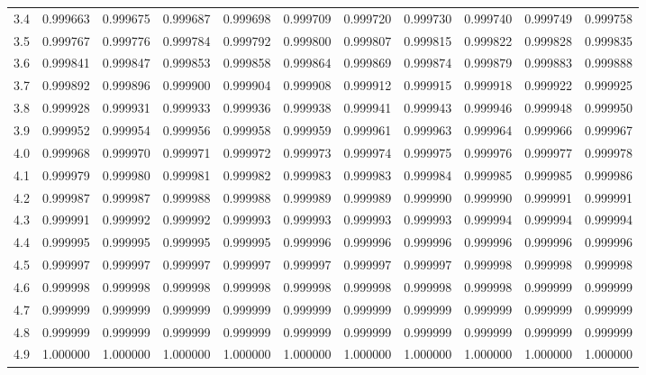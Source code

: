 \documentclass[12pt, a4paper]{article}
\begin{document}
\begin{center}
\begin{tabular}{lllllllllll}
3.4& 0.999663&0.999675&0.999687&0.999698&0.999709&0.999720&0.999730&0.999740&0.999749&0.999758 \\
3.5& 0.999767&0.999776&0.999784&0.999792&0.999800&0.999807&0.999815&0.999822&0.999828&0.999835 \\
3.6& 0.999841&0.999847&0.999853&0.999858&0.999864&0.999869&0.999874&0.999879&0.999883&0.999888 \\
3.7& 0.999892&0.999896&0.999900&0.999904&0.999908&0.999912&0.999915&0.999918&0.999922&0.999925 \\
3.8& 0.999928&0.999931&0.999933&0.999936&0.999938&0.999941&0.999943&0.999946&0.999948&0.999950 \\
3.9& 0.999952&0.999954&0.999956&0.999958&0.999959&0.999961&0.999963&0.999964&0.999966&0.999967 \\
4.0& 0.999968&0.999970&0.999971&0.999972&0.999973&0.999974&0.999975&0.999976&0.999977&0.999978 \\
4.1& 0.999979&0.999980&0.999981&0.999982&0.999983&0.999983&0.999984&0.999985&0.999985&0.999986 \\
4.2& 0.999987&0.999987&0.999988&0.999988&0.999989&0.999989&0.999990&0.999990&0.999991&0.999991 \\
4.3& 0.999991&0.999992&0.999992&0.999993&0.999993&0.999993&0.999993&0.999994&0.999994&0.999994 \\
4.4& 0.999995&0.999995&0.999995&0.999995&0.999996&0.999996&0.999996&0.999996&0.999996&0.999996 \\
4.5& 0.999997&0.999997&0.999997&0.999997&0.999997&0.999997&0.999997&0.999998&0.999998&0.999998 \\
4.6& 0.999998&0.999998&0.999998&0.999998&0.999998&0.999998&0.999998&0.999998&0.999999&0.999999 \\
4.7& 0.999999&0.999999&0.999999&0.999999&0.999999&0.999999&0.999999&0.999999&0.999999&0.999999 \\
4.8& 0.999999&0.999999&0.999999&0.999999&0.999999&0.999999&0.999999&0.999999&0.999999&0.999999 \\
4.9& 1.000000&1.000000&1.000000&1.000000&1.000000&1.000000&1.000000&1.000000&1.000000&1.000000
\end{tabular}
\end{center}
\end{document}
